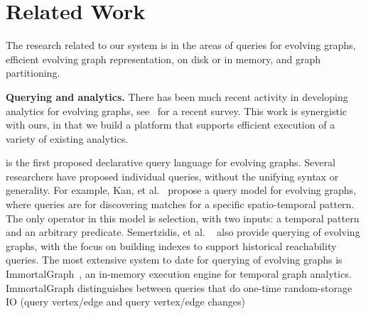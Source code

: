 \section{Related Work}
\label{sec:related}

The research related to our \ql system is in the areas of queries for
evolving graphs, efficient evolving graph representation, on disk or
in memory, and graph partitioning.

{\bf Querying and analytics.}  There has been much recent activity in
developing analytics for evolving graphs, see~\cite{} for a recent
survey.  This work is synergistic with ours, in that we build a
platform that supports efficient execution of a variety of existing
analytics.

\ql is the first proposed declarative query language for evolving
graphs.  Several researchers have proposed individual queries, without
the unifying syntax or generality.  For example, Kan, et
al.~\cite{Kan2009} propose a query model for evolving graphs, where
queries are for discovering matches for a specific spatio-temporal
pattern.  The only operator in this model is selection, with two
inputs: a temporal pattern and an arbitrary predicate.   Semertzidis, et
al. ~\cite{Semertzidis2015} also provide querying of evolving graphs,
with the focus on building indexes to support historical reachability
queries.  The most extensive system to date for querying of evolving
graphs is ImmortalGraph~\cite{DBLP:journals/tos/MiaoHLWYZPCC15}, an
in-memory execution engine for temporal graph analytics.
ImmortalGraph distinguishes between queries that do one-time
random-storage IO (query vertex/edge and query vertex/edge changes)
